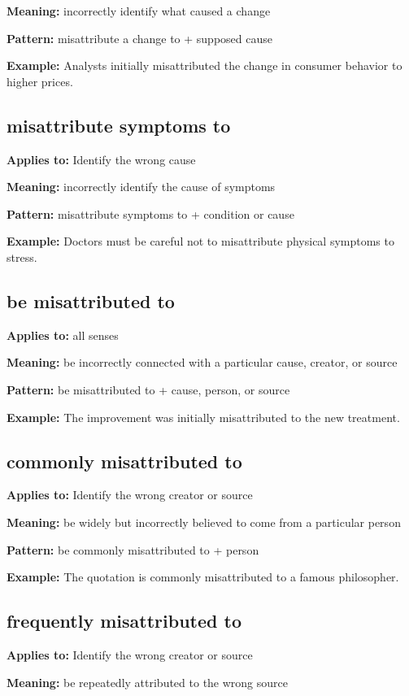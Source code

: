 \documentclass[11pt]{article}
\begin{document}
\textbf{Meaning:} incorrectly identify what caused a change

\textbf{Pattern:} misattribute a change to + supposed cause

\textbf{Example:} Analysts initially misattributed the change in consumer behavior to higher prices.

\subsection{misattribute symptoms to}
\textbf{Applies to:} Identify the wrong cause

\textbf{Meaning:} incorrectly identify the cause of symptoms

\textbf{Pattern:} misattribute symptoms to + condition or cause

\textbf{Example:} Doctors must be careful not to misattribute physical symptoms to stress.

\subsection{be misattributed to}
\textbf{Applies to:} all senses

\textbf{Meaning:} be incorrectly connected with a particular cause, creator, or source

\textbf{Pattern:} be misattributed to + cause, person, or source

\textbf{Example:} The improvement was initially misattributed to the new treatment.

\subsection{commonly misattributed to}
\textbf{Applies to:} Identify the wrong creator or source

\textbf{Meaning:} be widely but incorrectly believed to come from a particular person

\textbf{Pattern:} be commonly misattributed to + person

\textbf{Example:} The quotation is commonly misattributed to a famous philosopher.

\subsection{frequently misattributed to}
\textbf{Applies to:} Identify the wrong creator or source

\textbf{Meaning:} be repeatedly attributed to the wrong source
\end{document}
